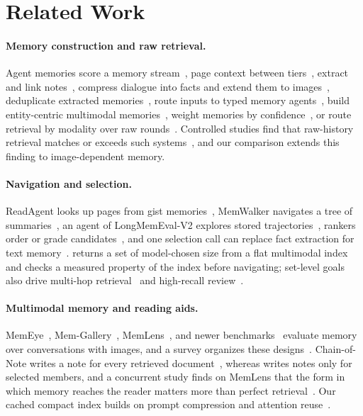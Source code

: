 \section{Related Work}
\label{sec:related}

\paragraph{Memory construction and raw retrieval.} Agent memories score a memory stream~\citep{park2023generative}, page context between tiers~\citep{packer2023memgpt}, extract and link notes~\citep{chhikara2025mem0,xu2025amem}, compress dialogue into facts and extend them to images~\citep{liu2026simplemem,liu2026omnisimplemem}, deduplicate extracted memories~\citep{chen2026telemem}, route inputs to typed memory agents~\citep{wang2025mirix}, build entity-centric multimodal memories~\citep{long2025m3agent}, weight memories by confidence~\citep{lu2026mma}, or route retrieval by modality over raw rounds~\citep{kang2026vmem}. Controlled studies find that raw-history retrieval matches or exceeds such systems~\citep{bao2026rawrag,zhou2026explicit,peng2026memorytax}, and our comparison extends this finding to image-dependent memory.

\paragraph{Navigation and selection.} ReadAgent looks up pages from gist memories~\citep{lee2024readagent}, MemWalker navigates a tree of summaries~\citep{chen2023memwalker}, an agent of LongMemEval-V2 explores stored trajectories~\citep{wu2026lmev2}, rankers order or grade candidates~\citep{sun2023rankgpt,zhuang2024beyond}, and one selection call can replace fact extraction for text memory~\citep{sharma2026selection}. \vgs{} returns a set of model-chosen size from a flat multimodal index and checks a measured property of the index before navigating; set-level goals also drive multi-hop retrieval~\citep{yang2018hotpotqa,gutierrez2024hipporag} and high-recall review~\citep{cormack2015autonomy}.

\paragraph{Multimodal memory and reading aids.} MemEye~\citep{guo2026memeye}, Mem-Gallery~\citep{bei2026memgallery}, MemLens~\citep{ren2026memlens}, and newer benchmarks~\citep{liu2026worldmemarena,chai2026smmbench,jiang2025memoryqa,nguyen2026personalvisual,tang2026dmvbench} evaluate memory over conversations with images, and a survey organizes these designs~\citep{guo2026seeingsurvey}. Chain-of-Note writes a note for every retrieved document~\citep{yu2023chainofnote}, whereas \vgs{} writes notes only for selected members, and a concurrent study finds on MemLens that the form in which memory reaches the reader matters more than perfect retrieval~\citep{jiang2026delivery}. Our cached compact index builds on prompt compression and attention reuse~\citep{jiang2023llmlingua,gim2023promptcache,jeong2024adaptiverag,zhang2026mempilot}.
